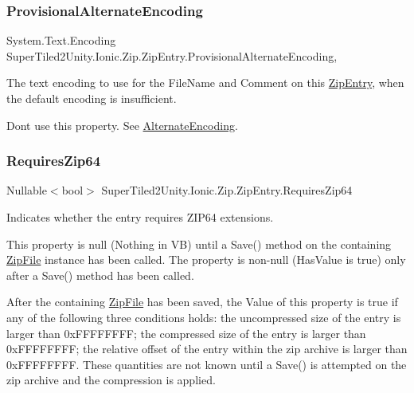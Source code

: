 \subsubsection{\texorpdfstring{Provisional\+Alternate\+Encoding}{ProvisionalAlternateEncoding}}
{\footnotesize\ttfamily System.\+Text.\+Encoding Super\+Tiled2\+Unity.\+Ionic.\+Zip.\+Zip\+Entry.\+Provisional\+Alternate\+Encoding\hspace{0.3cm}{\ttfamily [get]}, {\ttfamily [set]}}



The text encoding to use for the File\+Name and Comment on this \mbox{\hyperlink{class_super_tiled2_unity_1_1_ionic_1_1_zip_1_1_zip_entry}{Zip\+Entry}}, when the default encoding is insufficient. 

Don\textquotesingle{}t use this property. See \mbox{\hyperlink{class_super_tiled2_unity_1_1_ionic_1_1_zip_1_1_zip_entry_a7a5ff9afc8cad1de6fbfc76a7bf786ee}{Alternate\+Encoding}}. \mbox{\label{class_super_tiled2_unity_1_1_ionic_1_1_zip_1_1_zip_entry_ac89b4cc0aff95adfa926c3649042d539}} 
\subsubsection{\texorpdfstring{Requires\+Zip64}{RequiresZip64}}
{\footnotesize\ttfamily Nullable$<$bool$>$ Super\+Tiled2\+Unity.\+Ionic.\+Zip.\+Zip\+Entry.\+Requires\+Zip64\hspace{0.3cm}{\ttfamily [get]}}



Indicates whether the entry requires Z\+I\+P64 extensions. 

This property is null (Nothing in VB) until a {\ttfamily Save()} method on the containing \mbox{\hyperlink{class_super_tiled2_unity_1_1_ionic_1_1_zip_1_1_zip_file}{Zip\+File}} instance has been called. The property is non-\/null ({\ttfamily Has\+Value} is true) only after a {\ttfamily Save()} method has been called. 

After the containing {\ttfamily \mbox{\hyperlink{class_super_tiled2_unity_1_1_ionic_1_1_zip_1_1_zip_file}{Zip\+File}}} has been saved, the Value of this property is true if any of the following three conditions holds\+: the uncompressed size of the entry is larger than 0x\+F\+F\+F\+F\+F\+F\+FF; the compressed size of the entry is larger than 0x\+F\+F\+F\+F\+F\+F\+FF; the relative offset of the entry within the zip archive is larger than 0x\+F\+F\+F\+F\+F\+F\+FF. These quantities are not known until a {\ttfamily Save()} is attempted on the zip archive and the compression is applied. 

